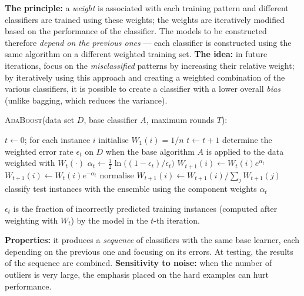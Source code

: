 \documentclass[11pt,a4paper]{article}
\theoremstyle{definition}
\begin{document}
\begin{defbox}
\textbf{The principle:} a \emph{weight} is associated with each training pattern and different
classifiers are trained using these weights; the weights are iteratively modified based on the
performance of the classifier. The models to be constructed therefore \emph{depend on the previous
ones} --- each classifier is constructed using the same algorithm on a different weighted training
set. \textbf{The idea:} in future iterations, focus on the \emph{misclassified} patterns by
increasing their relative weight; by iteratively using this approach and creating a weighted
combination of the various classifiers, it is possible to create a classifier with a lower overall
\emph{bias} (unlike bagging, which reduces the variance).

\textsc{AdaBoost}(data set $D$, base classifier $A$, maximum rounds $T$):
\begin{algorithmic}[1]
\State $t\gets 0$; for each instance $i$ initialise $W_1(i)=1/n$
\Repeat
  \State $t\gets t+1$
  \State determine the weighted error rate $\epsilon_t$ on $D$ when the base algorithm $A$ is
         applied to the data weighted with $W_t(\cdot)$
  \State $\alpha_t\gets \tfrac12\ln\big((1-\epsilon_t)/\epsilon_t\big)$
     \State $W_{t+1}(i)\gets W_t(i)e^{\alpha_t}$
  \EndFor
     \State $W_{t+1}(i)\gets W_t(i)e^{-\alpha_t}$
  \EndFor
  \State normalise $W_{t+1}(i)\gets W_{t+1}(i)/\sum_j W_{t+1}(j)$
\State classify test instances with the ensemble using the component weights $\alpha_t$
\end{algorithmic}
$\epsilon_t$ is the fraction of incorrectly predicted training instances (computed after weighting
with $W_t$) by the model in the $t$-th iteration.

\textbf{Properties:} it produces a \emph{sequence} of classifiers with the same base learner, each
depending on the previous one and focusing on its errors. At testing, the results of the sequence
are combined. \textbf{Sensitivity to noise:} when the number of outliers is very large, the
emphasis placed on the hard examples can hurt performance.
\end{defbox}
\end{document}
